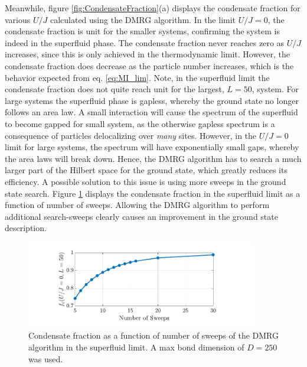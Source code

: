 Meanwhile, figure \ref{fig:CondensateFraction}(a) displays the condensate fraction for various $U/J$ calculated using the DMRG algorithm. In the limit $U/J = 0$, the condensate fraction is unit for the smaller systems, confirming the system is indeed in the superfluid phase. The condensate fraction never reaches zero as $U/J$ increases, since this is only achieved in the thermodynamic limit. However, the condensate fraction does decrease as the particle number increases, which is the behavior expected from eq. \eqref{eq:MI_lim}.
Note, in the superfluid limit the condensate fraction does not quite reach unit for the largest, $L = 50$, system. For large systems the superfluid phase is gapless, whereby the ground state no longer follows an area law. A small interaction will cause the spectrum of the superfluid to become gapped for small system, as the otherwise gapless spectrum is a consequence of particles delocalizing over \textit{many} sites. However, in the $U/J = 0$ limit for large systems, the spectrum will have exponentially small gaps, whereby the area laws will break down. Hence, the DMRG algorithm has to search a much larger part of the Hilbert space for the ground state, which greatly reduces its efficiency. A possible solution to this issue is using more sweeps in the ground state search. Figure \ref{fig:sweepdependence} displays the condensate fraction in the superfluid limit as a function of number of sweeps. Allowing the DMRG algorithm to perform additional search-sweeps clearly causes an improvement in the ground state description.\\ 
\begin{figure}[h!]
    \centering
    \includegraphics[width=0.9\textwidth]{Figures/CFsweeps.pdf}
    \caption{Condensate fraction as a function of number of sweeps of the DMRG algorithm in the superfluid limit. A max bond dimension of $D = 250$ was used.}
    \label{fig:sweepdependence}
\end{figure}

